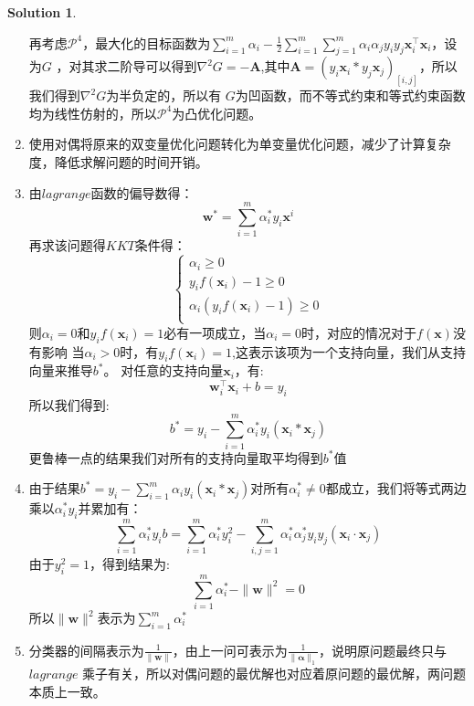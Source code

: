 \documentclass[a4paper,UTF8]{article}
\theoremstyle{definition}
\newtheorem*{solution}{Solution}
\begin{document}
\begin{solution}
\begin{enumerate}[(1)]
		      再考虑$\mathcal{P}^4$，最大化的目标函数为$\sum\limits_{i=1}^m \alpha_i - \frac{1}{2}\sum\limits_{i=1}^m \sum\limits_{j=1}^m\alpha_i \alpha_j y_i y_j\mathbf{x}_i^{\top}\mathbf{x}_i$，设为$G$
		      ，对其求二阶导可以得到$\nabla^2G=-\mathbf{A}$,其中$\mathbf{A}=(y_i\mathbf{x}_i*y_j\mathbf{x}_j)_[i,j]$，所以我们得到$\nabla^2G$为半负定的，所以有
		      $G$为凹函数，而不等式约束和等式约束函数均为线性仿射的，所以$\mathcal{P}^4$为凸优化问题。
		\item
		      使用对偶将原来的双变量优化问题转化为单变量优化问题，减少了计算复杂度，降低求解问题的时间开销。
		\item
		      由$lagrange$函数的偏导数得：
		      \[\mathbf{w}^*=\sum\limits_{i=1}^m\alpha_i^*y_i\mathbf{x}^i\]
		      再求该问题得$KKT$条件得：
		      \[\left\{
			      \begin{aligned}
				      \alpha_i \geq 0                       \\
				      y_if(\mathbf{x}_i)-1 \geq 0           \\
				      \alpha_i(y_if(\mathbf{x}_i)-1) \geq 0 \\
			      \end{aligned}
			      \right.\]
		      则$\alpha_i=0$和$y_if(\mathbf{x}_i)=1$必有一项成立，当$\alpha_i=0$时，对应的情况对于$f(\mathbf{x})$没有影响
		      当$\alpha_i>0$时，有$y_if(\mathbf{x}_i)=1$,这表示该项为一个支持向量，我们从支持向量来推导$b^*$。
		      对任意的支持向量$\mathbf{x}_i$，有:
		      \[\mathbf{w}_i^{\top}\mathbf{x}_i+b=y_i\]
		      所以我们得到:
		      \[b^*=y_i-\sum\limits_{i=1}^m\alpha_i^*y_i(\mathbf{x}_i*\mathbf{x}_j)\]
		      更鲁棒一点的结果我们对所有的支持向量取平均得到$b^*$值
		\item
		      由于结果$b^*=y_i-\sum\limits_{i=1}^m\alpha_iy_i(\mathbf{x}_i*\mathbf{x}_j)$对所有$\alpha_i^*\neq0$都成立，我们将等式两边乘以$\alpha_i^*y_i$并累加有：
		      \[\sum\limits_{i=1}^{m} \alpha_{i}^* y_{i} b=\sum_{i=1}^{m} \alpha_{i}^* y_{i}^{2}-\sum\limits_{i, j=1}^{m} \alpha_{i}^* \alpha_{j}^* y_{i} y_{j}\left(\mathbf{x}_{i} \cdot \mathbf{x}_{j}\right)\]
		      由于$y_i^2=1$，得到结果为:
		      \[\sum\limits_{i=1}^{m} \alpha_{i}^*-\|\mathbf{w}\|^{2} = 0\]
		      所以$\|\mathbf{w}\|^2$表示为$\sum\limits_{i=1}^m\alpha_i^*$
		\item
		      分类器的间隔表示为$\frac{1}{\|\mathbf{w}\|}$，由上一问可表示为$\frac{1}{\|\bm{\alpha}\|_1}$，说明原问题最终只与$lagrange$
		      乘子有关，所以对偶问题的最优解也对应着原问题的最优解，两问题本质上一致。
	\end{enumerate}
\end{solution}
\end{document}
